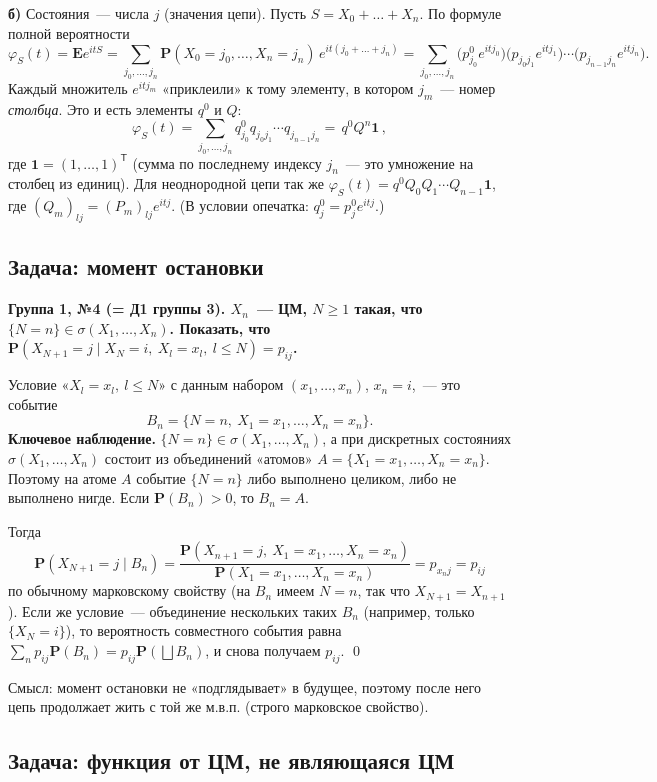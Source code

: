 \documentclass[11pt,a4paper]{article}
\theoremstyle{definition}
\newcommand{\PP}{\mathbf P}
\newcommand{\EE}{\mathbf E}
\newcommand{\1}{\mathbf 1}
\newenvironment{task}[1]{\par\medskip\noindent\colorbox{black!7}{\parbox{\dimexpr\linewidth-2\fboxsep}{\textbf{#1}}}\par\smallskip}{\par}
\begin{document}
\textbf{б)} Состояния~--- числа $j$ (значения цепи). Пусть $S=X_0+\dots+X_n$.
По формуле полной вероятности
\[
\varphi_S(t)=\EE e^{itS}=\sum_{j_0,\dots,j_n}\PP(X_0=j_0,\dots,X_n=j_n)\,e^{it(j_0+\dots+j_n)}
=\sum_{j_0,\dots,j_n}\bigl(p^0_{j_0}e^{itj_0}\bigr)\bigl(p_{j_0j_1}e^{itj_1}\bigr)\cdots\bigl(p_{j_{n-1}j_n}e^{itj_n}\bigr).
\]
Каждый множитель $e^{itj_m}$ «приклеили» к тому элементу, в котором $j_m$~---
номер \emph{столбца}. Это и есть элементы $q^0$ и $Q$:
\[
\varphi_S(t)=\sum_{j_0,\dots,j_n}q^0_{j_0}q_{j_0j_1}\cdots q_{j_{n-1}j_n}
=\boxed{\,q^0Q^n\mathbf 1\,},
\]
где $\mathbf 1=(1,\dots,1)^{\mathsf T}$ (сумма по последнему индексу $j_n$~---
это умножение на столбец из единиц). Для неоднородной цепи так же
$\varphi_S(t)=q^0Q_0Q_1\cdots Q_{n-1}\mathbf 1$, где
$(Q_m)_{lj}=(P_m)_{lj}e^{itj}$. (В условии опечатка: $q^0_j=p^0_je^{itj}$.)

\subsection{Задача: момент остановки}\label{z:stop}

\begin{task}{Группа 1, №4 (= Д1 группы 3). $X_n$~--- ЦМ, $N\ge1$ такая, что
$\{N=n\}\in\sigma(X_1,\dots,X_n)$. Показать, что
$\PP(X_{N+1}=j\mid X_N=i,\ X_l=x_l,\ l\le N)=p_{ij}$.}
\end{task}
Условие «$X_l=x_l,\ l\le N$» с данным набором $(x_1,\dots,x_n)$, $x_n=i$,~---
это событие
\[
B_n=\{N=n,\ X_1=x_1,\dots,X_n=x_n\}.
\]
\textbf{Ключевое наблюдение.} $\{N=n\}\in\sigma(X_1,\dots,X_n)$, а при дискретных
состояниях $\sigma(X_1,\dots,X_n)$ состоит из объединений «атомов»
$A=\{X_1=x_1,\dots,X_n=x_n\}$. Поэтому на атоме $A$ событие $\{N=n\}$ либо
выполнено целиком, либо не выполнено нигде. Если $\PP(B_n)>0$, то
$B_n=A$.

Тогда
\[
\PP(X_{N+1}=j\mid B_n)=\frac{\PP(X_{n+1}=j,\ X_1=x_1,\dots,X_n=x_n)}{\PP(X_1=x_1,\dots,X_n=x_n)}
=p_{x_nj}=p_{ij}
\]
по обычному марковскому свойству (на $B_n$ имеем $N=n$, так что
$X_{N+1}=X_{n+1}$). Если же условие~--- объединение нескольких таких $B_n$
(например, только $\{X_N=i\}$), то вероятность совместного события равна
$\sum_n p_{ij}\PP(B_n)=p_{ij}\PP(\bigsqcup B_n)$, и снова получаем $p_{ij}$.
\qed

Смысл: момент остановки не «подглядывает» в будущее, поэтому после него цепь
продолжает жить с той же м.в.п. (строго марковское свойство).

\subsection{Задача: функция от ЦМ, не являющаяся ЦМ}\label{z:func}
\end{document}
